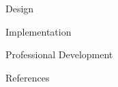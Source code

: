 \documentclass{matthijs}
\begin{document}
	\begin{hoofdstuk}{Design}

	\end{hoofdstuk}
	
	\begin{hoofdstuk}{Implementation}

	\end{hoofdstuk}
	
	\begin{hoofdstuk}{Professional Development}

	\end{hoofdstuk}

	\begin{hoofdstuk}{References}

		\printbibliography[heading=none]

	\end{hoofdstuk}

	\makelastpage
\end{document}
